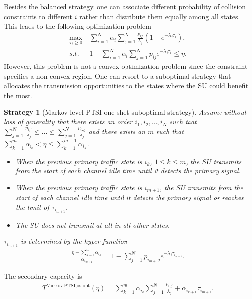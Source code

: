 \documentclass[10pt,final,journal,letterpaper]{IEEEtran}
\newtheorem{strategy}{Strategy}
\begin{document}
\par
Besides the balanced strategy, one can associate different probability of collision constraints to different $i$ rather than distribute them equally among all states. This leads to the following optimization problem
\begin{align}\label{sec3prob1}
    \max\limits_{\tau_i\geq 0}&\ \sum_{i=1}^N\alpha_i\sum_{j=1}^N\frac{p_{ij}}{\lambda_j}(1-e^{-\lambda_j\tau_i}),\nonumber\\
    s.t.&\ 1-\sum_{i=1}^N\alpha_i\sum_{j=1}^Np_{ij}e^{-\lambda_j\tau_i}\leq\eta.
\end{align}
However, this problem is not a convex optimization problem since the constraint specifies a non-convex region. One can resort to a suboptimal strategy that allocates the transmission opportunities to the states where the SU could benefit the most.
\begin{strategy}[Markov-level PTSI one-shot suboptimal strategy]
Assume without loss of generality that there exists an order $i_1, i_2, \ldots, i_N$ such that $\sum_{j=1}^N\frac{p_{i_1j}}{\lambda_j}\leq\ldots\leq\sum_{j=1}^N\frac{p_{i_Nj}}{\lambda_j}$ and there exists an $m$ such that $\sum_{k=1}^m\alpha_{i_k}<\eta\leq\sum_{k=1}^{m+1}\alpha_{i_k}$.
\begin{itemize}
  \item When the previous primary traffic state is $i_k$, $1\leq k\leq m$, the SU transmits from the start of each channel idle time until it detects the primary signal.
  \item When the previous primary traffic state is $i_{m+1}$, the SU transmits from the start of each channel idle time until it detects the primary signal or reaches the limit of $\tau_{i_{m+1}}$.
  \item The SU does not transmit at all in all other states.
\end{itemize}
$\tau_{i_{m+1}}$ is determined by the hyper-function
\begin{align}
    \frac{\eta-\sum_{k=1}^m\alpha_{i_k}}{\alpha_{i_{m+1}}}=1-\sum_{j=1}^Np_{i_{m+1}j}e^{-\lambda_j\tau_{i_{m+1}}}.\nonumber
\end{align}
\end{strategy}
The secondary capacity is
\begin{align}\label{sec3eq8}
    T^{\text{Markov-PTSI,os-opt}}(\eta)=\sum_{k=1}^{m}\alpha_{i_{k}}\sum_{j=1}^{N}\frac{p_{{i_{k}}j}}{\lambda_j}+\alpha_{i_{m+1}}\tau_{i_{m+1}}.
\end{align}
\end{document}
